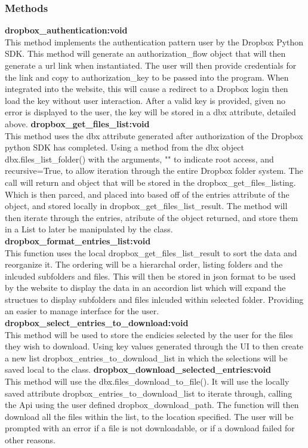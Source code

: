 \subsubsection{Methods}
\textbf{dropbox\_authentication:void} \\
    This method implements the authentication pattern user by the Dropbox Python SDK. This method will generate an authorization\_flow object
    that will then generate a url link when instantiated. The user will then provide credentials for the link and copy to authorization\_key 
    to be passed into the program. When integrated into the website, this will cause a redirect to a Dropbox login then load the key without 
    user interaction. After a valid key is provided, given no error is displayed to the user, the key will be stored in a dbx attribute, detailed 
    above.  
\textbf{dropbox\_get\_files\_list:void} \\
    This method uses the dbx attribute generated after authorization of the Dropbox python SDK has completed. Using a method from the dbx object
    dbx.files\_list\_folder() with the arguments, "" to indicate root access, and recursive=True, to allow iteration through the entire Dropbox
    folder system. The call will return and object that will be stored in the dropbox\_get\_files\_listing. Which is then parced, and placed into
    based off of the entries attribute of the object, and stored locally in dropbox\_get\_files\_list\_result. The method will then iterate through
    the entries, atribute of the object returned, and store them in a List to later be manipulated by the class.
\textbf{dropbox\_format\_entries\_list:void} \\
    This function uses the local dropbox\_get\_files\_list\_result to sort the data and reorganize it. The ordering will be a hierarchal order, listing 
    folders and the inlcuded subfolders and files. This will then be stored in json format to be used by the website to display the data in an
    accordion list which will expand the structues to display subfolders and files inlcuded within selected folder. Providing an easier to manage
    interface for the user.
\textbf{dropbox\_select\_entries\_to\_download:void} \\
    This method will be used to store the endicies selected by the user for the files they wish to download. Using key values generated through 
    the UI to then create a new list dropbox\_entries\_to\_download\_list in which the selections will be saved local to the class.
\textbf{dropbox\_download\_selected\_entries:void} \\
    This method will use the dbx.files\_download\_to\_file(). It will use the locally saved attribute dropbox\_entries\_to\_download\_list to
    iterate through, calling the Api using the user defined dropbox\_download\_path. The function will then download all the files within the 
    list, to the location specified. The user will be prompted with an error if a file is not downloadable, or if a download failed for other 
    reasons.

